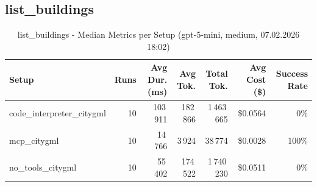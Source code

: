 \documentclass[a4paper,11pt]{article}
\begin{document}
\clearpage

\subsection{list\_buildings}

\begin{table}[H]
\centering
\scriptsize
\caption{list\_buildings - Median Metrics per Setup (gpt-5-mini, medium, 07.02.2026 18:02)}
\label{tab:combined\_list\_buildings\_metrics\_20260207}
\begin{tabular}{l r r r r r r}
\toprule
Setup & Runs & Avg Dur. (ms) & Avg Tok. & Total Tok. & Avg Cost (\$) & Success Rate \\
\midrule
code\_interpreter\_citygml & 10 & 103\,911 & 182\,866 & 1\,463\,665 & \$0.0564 & 0\% \\
mcp\_citygml & 10 & 14\,766 & 3\,924 & 38\,774 & \$0.0028 & 100\% \\
no\_tools\_citygml & 10 & 55\,402 & 174\,522 & 1\,740\,230 & \$0.0511 & 0\% \\
\bottomrule
\end{tabular}
\end{table}
\end{document}
